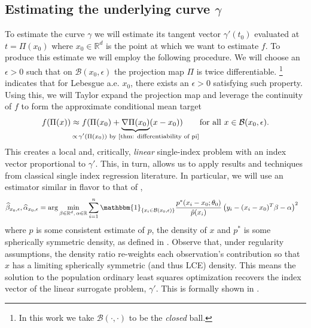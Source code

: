 \documentclass[11pt]{article}
\begin{document}
\subsection{Estimating the underlying curve $\gamma$}

To estimate the curve $\gamma$ we will estimate its tangent vector $\gamma'(t_0)$ evaluated at $t = \Pi(x_0)$ where $x_0\in \mathbb{R}^d$ is the point at which we want to estimate $f$. To produce this estimate we will employ the following procedure.  We will choose an $\epsilon > 0$ such that on $\mathcal{B}(x_0, \epsilon)$ the projection map $\Pi$ is twice differentiable. \footnote{In this work we take $\mathcal{B}(\cdot, \cdot )$ to be the \textit{closed} ball.}  indicates that for Lebesgue a.e. $x_0$, there exists an $\epsilon > 0$ satisfying such property. Using this, we will Taylor expand the projection map and leverage the continuity of $f$ to form the approximate conditional mean target
\begin{equation} \label{eq: surrogate decomposition colloquial}
    f(\Pi(x)) \approx f(\Pi(x_0) + \underbrace{\nabla\Pi(x_0)}_{\mathclap{\propto\, \gamma'(\Pi(x_0)) \text{ by \Cref{thm: differentiability of pi}}}}(x - x_0)) \qquad \text{for all }x \in \mathcal{B}(x_0, \epsilon).
\end{equation}
This creates a local and, critically, \textit{linear}  single-index problem with an index vector proportional to $\gamma'$. This, in turn, allows us to apply results and techniques from classical single index regression literature. In particular, we will use an estimator similar in flavor to that of \citet{Newey_Ruud_2005},
\begin{align} 
\widehat{\beta}_{x_0,\epsilon}, \widehat{\alpha}_{x_0, \epsilon} &= \arg\min_{\beta \in \mathbb{R}^d,\, \alpha \in \mathbb{R}} \sum_{i = 1}^{n}\mathbbm{1}_{\{x_i \in \mathcal{B}(x_0, \epsilon)\}}\frac{p^*(x_i - x_0;\theta_0)}{\hat{p}(x_i)}\left(y_i - (x_i - x_0)^{T}\beta - \alpha\right)^2 
\end{align}
where $\hat{p}$ is some consistent estimate of $p$, the density of $x$ and $p^*$ is some spherically symmetric density, as defined in . Observe that, under regularity assumptions, the density ratio re-weights each observation's contribution so that $x$ has a limiting spherically symmetric (and thus LCE) density. This means the solution to the population ordinary least squares optimization recovers the index vector of the linear surrogate problem, $\gamma'$. This is formally shown in .  
\end{document}
